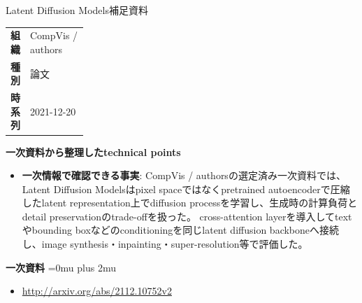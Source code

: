 \begin{technicalnote}{Latent Diffusion Models}{補足資料}
\begingroup
\begin{tabularx}{\linewidth}{@{}>{\bfseries}p{0.22\linewidth}X@{}}
組織 & CompVis / authors \\
種別 & 論文 \\
時系列 & 2021-12-20 \\
\end{tabularx}
\smallskip
{\bfseries 一次資料から整理したtechnical points}
\begin{itemize}[leftmargin=1.5em,itemsep=0.35em]
\item \textbf{一次情報で確認できる事実}: CompVis / authorsの選定済み一次資料では、Latent Diffusion Modelsはpixel spaceではなくpretrained autoencoderで圧縮したlatent representation上でdiffusion processを学習し、生成時の計算負荷とdetail preservationのtrade-offを扱った。 cross-attention layerを導入してtextやbounding boxなどのconditioningを同じlatent diffusion backboneへ接続し、image synthesis・inpainting・super-resolution等で評価した。
\end{itemize}
\begin{minipage}{\linewidth}
\begin{samepage}
{\bfseries 一次資料}
\begingroup\sloppy
\Urlmuskip=0mu plus 2mu\relax
\begin{itemize}[leftmargin=1.5em,itemsep=0.25em]
\item {\scriptsize\url{http://arxiv.org/abs/2112.10752v2}}
\end{itemize}
\endgroup
\end{samepage}
\end{minipage}
\endgroup
\end{technicalnote}
\medskip

